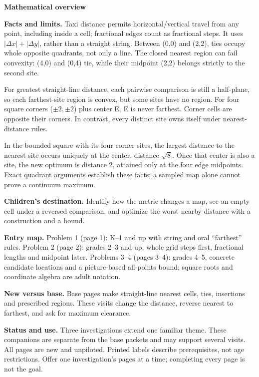 \documentclass[11pt]{article}
\begin{document}
{\Large\bfseries Mathematical overview}\par\medskip
\textbf{Facts and limits.} Taxi distance permits horizontal/vertical travel from any point, including inside a cell; fractional edges count as fractional steps. It uses \(|\Delta x|+|\Delta y|\), rather than a straight string. Between (0,0) and (2,2), ties occupy whole opposite quadrants, not only a line. The closed nearest region can fail convexity: (4,0) and (0,4) tie, while their midpoint (2,2) belongs strictly to the second site.

For greatest straight-line distance, each pairwise comparison is still a half-plane, so each farthest-site region is convex, but some sites have no region. For four square corners (\(\pm2,\pm2\)) plus center E, E is never farthest. Corner cells are opposite their corners. In contrast, every distinct site owns itself under nearest-distance rules.

In the bounded square with its four corner sites, the largest distance to the nearest site occurs uniquely at the center, distance \(\sqrt8\). Once that center is also a site, the new optimum is distance 2, attained only at the four edge midpoints. Exact quadrant arguments establish these facts; a sampled map alone cannot prove a continuum maximum.

\textbf{Children's destination.} Identify how the metric changes a map, see an empty cell under a reversed comparison, and optimize the worst nearby distance with a construction and a bound.

\textbf{Entry map.} Problem 1 (page 1): K--1 and up with string and oral ``farthest'' rules. Problem 2 (page 2): grades 2--3 and up, whole grid steps first, fractional lengths and midpoint later. Problems 3--4 (pages 3--4): grades 4--5, concrete candidate locations and a picture-based all-points bound; square roots and coordinate algebra are adult notation.

\textbf{New versus base.} Base pages make straight-line nearest cells, ties, insertions and prescribed regions. These visits change the distance, reverse nearest to farthest, and ask for maximum clearance.
\par\medskip
\textbf{Status and use.} Three investigations extend one familiar theme. These companions are separate from the base packets and may support several visits. All pages are new and unpiloted. Printed labels describe prerequisites, not age restrictions. Offer one investigation’s pages at a time; completing every page is not the goal.
\end{document}

